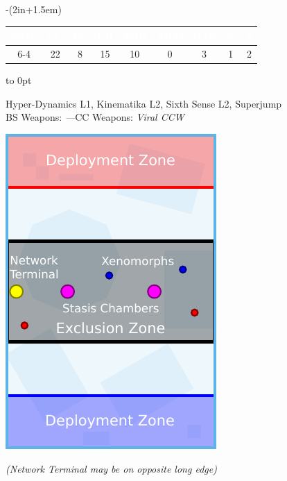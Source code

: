\begin{stdminipage}{\linewidth-(2in+1.5em)}
\begin{minipage}{\linewidth}
{\begin{minipage}{5in}
\colorbox{Gray!24}{\begin{minipage}{\linewidth-2\fboxsep}

    \medskip    
\noindent\hfill\begin{tabular}[t]{ccccccccc}
\rowcolor{Black}  \textbf{\textcolor{White}{MOV}} & \textbf{\textcolor{White}{CC}} & \textbf{\textcolor{White}{BS}} & \textbf{\textcolor{White}{PH}} & \textbf{\textcolor{White}{WIP}} & \textbf{\textcolor{White}{ARM}} & \textbf{\textcolor{White}{BTS}} & \textbf{\textcolor{White}{W}} & \textbf{\textcolor{White}{S}}\\
  \hline
  6-4 & 22 & 8 & 15 & 10 & 0 & 3 & 1 & 2\\
\end{tabular}
\hfill\hbox to 0pt{}

\medskip
Hyper-Dynamics L1, Kinematika L2, Sixth Sense L2, Superjump\\
BS Weapons: \emph{---}\hfill CC Weapons: \emph{Viral CCW}
    \end{minipage}}
\end{minipage}}
\end{minipage}

\end{stdminipage}
\hfill
\begin{minipage}[t]{2in}\centering
\vspace{4pt}   
\includegraphics{maps/map-bio}

\medskip\small%
\emph{(Network Terminal may be on opposite long edge)}
\end{minipage}

